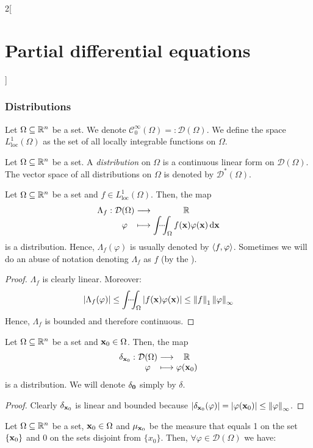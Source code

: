 \documentclass[../../../main_math.tex]{subfiles}
\begin{document}
\begin{multicols}{2}[\section{Partial differential equations}]
  \subsubsection{Distributions}
  \begin{definition}
    Let $\Omega\subseteq \mathbb{R}^n$ be a set. We denote $\mathcal{C}_0^\infty(\Omega)=:\mathcal{D}(\Omega)$. We define the space $L_{\mathrm{loc}}^1(\Omega)$ as the set of all locally integrable functions on $\Omega$.
  \end{definition}
  \begin{definition}[Distribution]
    Let $\Omega\subseteq \mathbb{R}^n$ be a set. A \emph{distribution} on $\Omega$ is a continuous linear form on $\mathcal{D}(\Omega)$. The vector space of all distributions on $\Omega$ is denoted by $\mathcal{D}^*(\Omega)$.
  \end{definition}
  \begin{proposition}
    Let $\Omega\subseteq \mathbb{R}^n$ be a set and $f\in L_{\mathrm{loc}}^1(\Omega)$. Then, the map
    $$
      \function{\Lambda_f}{\mathcal{D}(\Omega)}{\RR}{\varphi}{\displaystyle\idotsint_\Omega f(\vf{x})\varphi(\vf{x})\dd{\vf{x}}}
    $$
    is a distribution. Hence, $\Lambda_f(\varphi)$ is usually denoted by ${\left\langle f,\varphi\right\rangle}$. Sometimes we will do an abuse of notation denoting $\Lambda_f$ as $f$ (by the ).
  \end{proposition}
  \begin{proof}
    $\Lambda_f$ is clearly linear. Moreover: $$\abs{\Lambda_f(\varphi)}\leq\idotsint_\Omega\abs{f(\boldsymbol{\mathrm{x}})\varphi(\boldsymbol{\mathrm{x}})}\leq \left\|f\right\|_1\left\|\varphi\right\|_\infty$$
    Hence, $\Lambda_f$ is bounded and therefore continuous.
  \end{proof}
  \begin{proposition}
    Let $\Omega\subseteq \mathbb{R}^n$ be a set and $\boldsymbol{\mathrm{x}}_0\in\Omega$. Then, the map
    $$
      \function{\delta_{\vf{x}_0}}{\mathcal{D}(\Omega)}{\RR}{\varphi}{\varphi(\vf{x}_0)}
    $$
    is a distribution. We will denote $\delta_{\boldsymbol{\mathrm{0}}}$ simply by $\delta$.
  \end{proposition}
  \begin{proof}
    Clearly $\delta_{\boldsymbol{\mathrm{x}}_0}$ is linear and bounded because $\abs{\delta_{\boldsymbol{\mathrm{x}}_0}(\varphi)}=\abs{\varphi(\boldsymbol{\mathrm{x}}_0)}\leq \left\|\varphi\right\|_\infty$.
  \end{proof}
  \begin{lemma}
    Let $\Omega\subseteq \mathbb{R}^n$ be a set, $\boldsymbol{\mathrm{x}}_0\in\Omega$ and $\mu_{\boldsymbol{\mathrm{x}}_0}$ be the measure that equals 1 on the set $\{\boldsymbol{\mathrm{x}}_0\}$ and $0$ on the sets disjoint from $\{x_0\}$. Then, $\forall\varphi\in\mathcal{D}(\Omega)$ we have:

\end{lemma}
\end{multicols}
\end{document}
